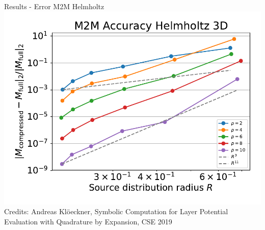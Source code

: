 \documentclass[10pt]{beamer}
\begin{document}
\begin{frame}[fragile]{Results - Error M2M Helmholtz}
\includegraphics[scale=0.6]{figures/accuracy-helmholtz-3d.pdf}
Credits: Andreas Kl{\"o}eckner, Symbolic Computation for Layer Potential Evaluation with Quadrature by Expansion, CSE 2019
\end{frame}
\end{document}
